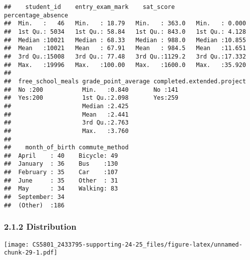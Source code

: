 \documentclass[
]{article}
\newenvironment{Shaded}{\begin{snugshade}}{\end{snugshade}}
\newcommand{\AttributeTok}[1]{\textcolor[rgb]{0.13,0.29,0.53}{#1}}
\newcommand{\CommentTok}[1]{\textcolor[rgb]{0.56,0.35,0.01}{\textit{#1}}}
\newcommand{\DecValTok}[1]{\textcolor[rgb]{0.00,0.00,0.81}{#1}}
\newcommand{\FunctionTok}[1]{\textcolor[rgb]{0.13,0.29,0.53}{\textbf{#1}}}
\newcommand{\NormalTok}[1]{#1}
\newcommand{\SpecialCharTok}[1]{\textcolor[rgb]{0.81,0.36,0.00}{\textbf{#1}}}
\newcommand{\StringTok}[1]{\textcolor[rgb]{0.31,0.60,0.02}{#1}}
\begin{document}
\begin{verbatim}
##    student_id    entry_exam_mark    sat_score      percentage_absence
##  Min.   :   46   Min.   : 18.79   Min.   : 363.0   Min.   : 0.000    
##  1st Qu.: 5034   1st Qu.: 58.84   1st Qu.: 843.0   1st Qu.: 4.128    
##  Median :10021   Median : 68.33   Median : 988.0   Median :10.855    
##  Mean   :10021   Mean   : 67.91   Mean   : 984.5   Mean   :11.651    
##  3rd Qu.:15008   3rd Qu.: 77.48   3rd Qu.:1129.2   3rd Qu.:17.332    
##  Max.   :19996   Max.   :100.00   Max.   :1600.0   Max.   :35.920    
##                                                                      
##  free_school_meals grade_point_average completed.extended.project
##  No :200           Min.   :0.840       No :141                   
##  Yes:200           1st Qu.:2.098       Yes:259                   
##                    Median :2.425                                 
##                    Mean   :2.441                                 
##                    3rd Qu.:2.763                                 
##                    Max.   :3.760                                 
##                                                                  
##    month_of_birth commute_method
##  April    : 40    Bicycle: 49   
##  January  : 36    Bus    :130   
##  February : 35    Car    :107   
##  June     : 35    Other  : 31   
##  May      : 34    Walking: 83   
##  September: 34                  
##  (Other)  :186
\end{verbatim}

\subsubsection{2.1.2 Distribution}\label{distribution}

\begin{Shaded}
\end{Shaded}

\texttt{[image: CS5801\_2433795-supporting-24-25\_files/figure-latex/unnamed-chunk-29-1.pdf]}
\end{document}
